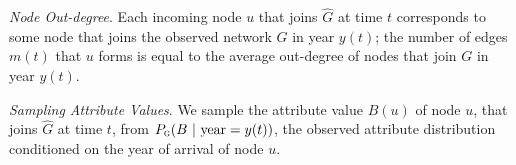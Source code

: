 \textit{Node Out-degree}.
Each incoming node $u$ that joins $\hat{G}$ at time $t$ corresponds to some
node that joins the observed network $G$ in year $y(t)$; the number of edges $m(t)$
that $u$ forms is equal to the average out-degree of nodes that join $G$ in year $y(t)$.

\textit{Sampling Attribute Values}.
We sample the attribute value $B(u)$ of node $u$, that
joins $\hat{G}$ at time $t$, from $P_{\textsc{g}}(B{\mbox{ | year}=y(t)})$, the observed attribute distribution conditioned on the year of arrival of node $u$.





